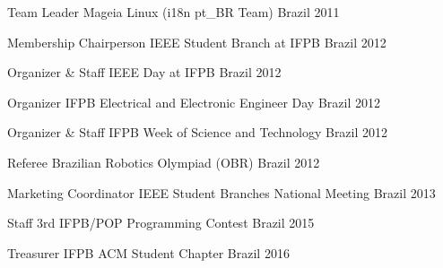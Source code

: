 

\begin{cvhonors}

  \cvhonor
    {Team Leader} %
    {Mageia Linux (i18n pt\_BR Team)} %
    {Brazil} %
    {2011} %

  \cvhonor
    {Membership Chairperson} %
    {IEEE Student Branch at IFPB} %
    {Brazil} %
    {2012} %
    
\cvhonor
    {Organizer \& Staff} %
    {IEEE Day at IFPB} %
    {Brazil} %
    {2012} %
    
  \cvhonor
    {Organizer} %
    {IFPB Electrical and Electronic Engineer Day} %
    {Brazil} %
    {2012} %
        
  \cvhonor
    {Organizer \& Staff} %
    {IFPB Week of Science and Technology} %
    {Brazil} %
    {2012} %
    
  \cvhonor
    {Referee} %
    {Brazilian Robotics Olympiad (OBR)} %
    {Brazil} %
    {2012} %
    
  \cvhonor
    {Marketing Coordinator} %
    {IEEE Student Branches National Meeting} %
    {Brazil} %
    {2013} %

  \cvhonor
    {Staff} %
    {3rd IFPB/POP Programming Contest} %
    {Brazil} %
    {2015} %

  \cvhonor
    {Treasurer} %
    {IFPB ACM Student Chapter} %
    {Brazil} %
    {2016} %


\end{cvhonors}
